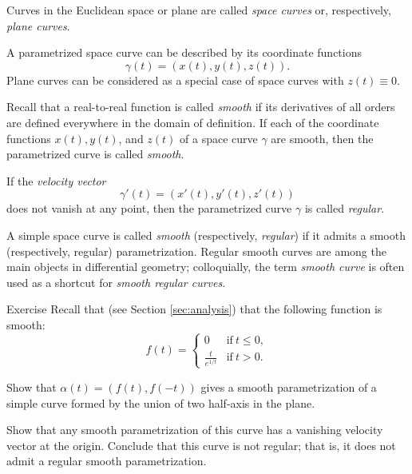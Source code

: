 Curves in the Euclidean space or plane are called \emph{space curves} or, respectively, \emph{plane curves}.

A parametrized space curve can be described by its coordinate functions 
\[\gamma(t)=(x(t),y(t),z(t)).\]
Plane curves can be considered as a special case of space curves with $z(t)\equiv 0$.

Recall that a real-to-real function is called \emph{smooth} if its derivatives of all orders are defined everywhere in the domain of definition.  
If each of the coordinate functions $x(t), y(t)$, and $z(t)$ of a space curve $\gamma$ are smooth, then the parametrized curve is called \emph{smooth}.

If the \emph{velocity vector} 
\[\gamma'(t)=(x'(t),y'(t),z'(t))\] 
does not vanish at any point, then the parametrized curve $\gamma$ is called \emph{regular}.

A simple space curve is called \emph{smooth} (respectively, {}\emph{regular}) if it admits a smooth (respectively, regular) parametrization.
Regular smooth curves are among the main objects in differential geometry;
colloquially, the term \emph{smooth curve} is often used as a shortcut for {}\emph{smooth regular curves}. 

\begin{thm}{Exercise}\label{ex:L-shape}
Recall that (see Section \ref{sec:analysis}) that the following function is smooth: 
\[f(t)=
\begin{cases}
0&\text{if}\ t\le 0,
\\
\frac{t}{e^{1\!/\!t}}&\text{if}\ t> 0.
\end{cases}
\]

Show that $\alpha(t)=(f(t),f(-t))$ gives a smooth parametrization of a simple curve formed by the union of two half-axis in the plane.

Show that any smooth parametrization of this curve has a vanishing velocity vector at the origin.
Conclude that this curve is not regular;
that is, it does not admit a regular smooth parametrization.
\end{thm}


